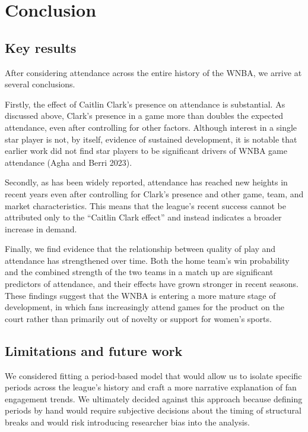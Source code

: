 \documentclass[
  letterpaper,
  DIV=11,
  numbers=noendperiod]{scrartcl}
\begin{document}
\section{Conclusion}\label{conclusion}

\subsection{Key results}\label{key-results}

After considering attendance across the entire history of the WNBA, we
arrive at several conclusions.

Firstly, the effect of Caitlin Clark's presence on attendance is
substantial. As discussed above, Clark's presence in a game more than
doubles the expected attendance, even after controlling for other
factors. Although interest in a single star player is not, by itself,
evidence of sustained development, it is notable that earlier work did
not find star players to be significant drivers of WNBA game attendance
(Agha and Berri 2023).

Secondly, as has been widely reported, attendance has reached new
heights in recent years even after controlling for Clark's presence and
other game, team, and market characteristics. This means that the
league's recent success cannot be attributed only to the ``Caitlin Clark
effect'' and instead indicates a broader increase in demand.

Finally, we find evidence that the relationship between quality of play
and attendance has strengthened over time. Both the home team's win
probability and the combined strength of the two teams in a match up are
significant predictors of attendance, and their effects have grown
stronger in recent seasons. These findings suggest that the WNBA is
entering a more mature stage of development, in which fans increasingly
attend games for the product on the court rather than primarily out of
novelty or support for women's sports.

\subsection{Limitations and future
work}\label{limitations-and-future-work}

We considered fitting a period-based model that would allow us to
isolate specific periods across the league's history and craft a more
narrative explanation of fan engagement trends. We ultimately decided
against this approach because defining periods by hand would require
subjective decisions about the timing of structural breaks and would
risk introducing researcher bias into the analysis.
\end{document}

